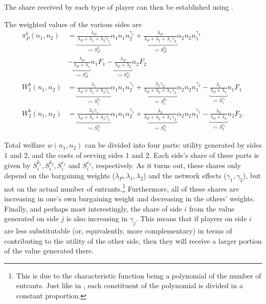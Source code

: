 The share received by each type of player can then be established using .
\begin{proposition}
    \label{prop:bargaining_entry_fees}
    The weighted values of the various sides are
    \begin{align*}
        \pi_P^b(n_1, n_2) &= \underbracket{\frac{\lambda_P}{\lambda_P + \lambda_1 + \lambda_2\gamma_1}}_{\coloneqq S_P^{b_1}} \alpha_1 n_1 n_2^{\gamma_1} + \underbracket{\frac{\lambda_P}{\lambda_P + \lambda_2 + \lambda_1\gamma_2}}_{\coloneqq S_P^{b_2}} \alpha_2 n_2 n_1^{\gamma_2} \\
        &- \underbracket{\frac{\lambda_P}{\lambda_P + \lambda_1}}_{\coloneqq S_P^{c_1}} n_1 F_1 - \underbracket{\frac{\lambda_P}{\lambda_P + \lambda_2}}_{\coloneqq S_P^{c_2}} n_2 F_2 \\
        W_1^b(n_1, n_2) &= \underbracket{\frac{\lambda_1}{\lambda_P + \lambda_1 + \lambda_2\gamma_1}}_{\coloneqq S_1^{b_1}} \alpha_1 n_1 n_2^{\gamma_1} + \underbracket{\frac{\lambda_1 \gamma_2}{\lambda_P + \lambda_2 + \lambda_1\gamma_2}}_{\coloneqq S_1^{b_2}}  \alpha_2 n_2 n_1^{\gamma_2} - \underbracket{\frac{\lambda_1}{\lambda_P + \lambda_1}}_{\coloneqq S_1^{c_1}} n_1 F_1 \\
        W_2^b(n_1, n_2) &= \underbracket{\frac{\lambda_2\gamma_1}{\lambda_P + \lambda_1 + \lambda_2\gamma_1}}_{\coloneqq S_2^{b_1}} \alpha_1 n_1 n_2^{\gamma_1} + \underbracket{\frac{\lambda_2}{\lambda_P + \lambda_2 + \lambda_1\gamma_2}}_{\coloneqq S_2^{b_1}} \alpha_2 n_2 n_1^{\gamma_2} - \underbracket{\frac{\lambda_2}{\lambda_P + \lambda_2}}_{\coloneqq S_2^{c_2}} n_2 F_2.
    \end{align*}
\end{proposition}

Total welfare $w(n_1, n_2)$ can be divided into four parts: utility generated by sides $1$ and $2$, and the costs of serving sides $1$ and $2$.
Each side's share of these parts is given by $S_i^{b_1}, S_i^{b_2}, S_i^{c_1}$ and $S_i^{c_2}$, respectively.
As it turns out, these shares only depend on the bargaining weights ($\lambda_P, \lambda_1, \lambda_2$) and the network effects ($\gamma_1, \gamma_2$), but not on the actual number of entrants.\footnote{
    This is due to the characteristic function being a polynomial of the number of entrants.
    Just like in , each constituent of the polynomial is divided in a constant proportion.
}
Furthermore, all of these shares are increasing in one's own bargaining weight and decreasing in the others' weights.
Finally, and perhaps most interestingly, the share of side $i$ from the value generated on side $j$ is also increasing in $\gamma_j$.
This means that if players on side $i$ are less substitutable (or, equivalently, more complementary) in terms of contributing to the utility of the other side, then they will receive a larger portion of the value generated there.

